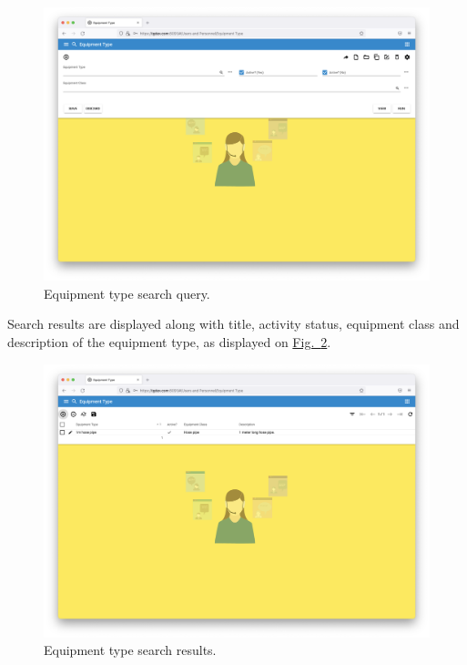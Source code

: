     \begin{figure}[!htbp]
	\centering
	\includegraphics[width=0.95\linewidth]{sections/equipment/images/Fig.9.png}
	\caption{Equipment type search query.}\label{sections/equipment/images/Fig.9}
	\end{figure}
	
\newpage
Search results are displayed along with title, activity status, equipment class and description of the equipment type, as displayed on \hyperref[sections/equipment/images/Fig.10]{Fig.~\ref*{sections/equipment/images/Fig.10}}.

    \begin{figure}[!htbp]
	\centering
	\includegraphics[width=0.95\linewidth]{sections/equipment/images/Fig.10.png}
	\caption{Equipment type search results.}\label{sections/equipment/images/Fig.10}
	\end{figure}

